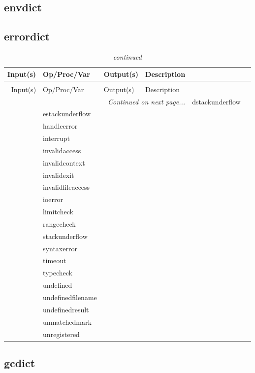 \subsection{envdict}
\subsection{errordict}

\begin{longtable}{|r|l|l|p{4in}|}
\caption{errordict summary} \\
\hline
Input(s) & Op/Proc/Var & Output(s) & Description \\
\hline \hline
\endfirsthead
\caption[]{\emph{continued}} \\
\hline
Input(s) & Op/Proc/Var & Output(s) & Description \\
\hline \hline \endhead
\hline
\multicolumn{4}{r}{\emph{Continued on next page...}} \endfoot
\hline \endlastfoot
& dstackunderflow & & \\
\hline
& estackunderflow & & \\
\hline
& handleerror & & \\
\hline
& interrupt & & \\
\hline
& invalidaccess & & \\
\hline
& invalidcontext & & \\
\hline
& invalidexit & & \\
\hline
& invalidfileaccess & & \\
\hline
& ioerror & & \\
\hline
& limitcheck & & \\
\hline
& rangecheck & & \\
\hline
& stackunderflow & & \\
\hline
& syntaxerror & & \\
\hline
& timeout & & \\
\hline
& typecheck & & \\
\hline
& undefined & & \\
\hline
& undefinedfilename & & \\
\hline
& undefinedresult & & \\
\hline
& unmatchedmark & & \\
\hline
& unregistered & & \\
\hline
\end{longtable}

\subsection{gcdict}

